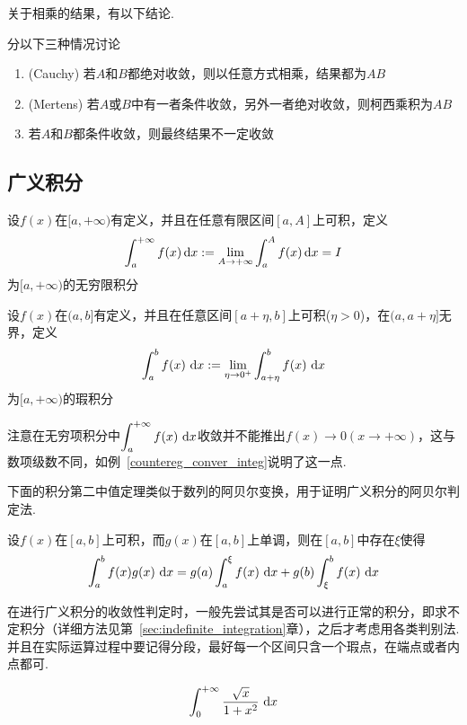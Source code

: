\par 关于相乘的结果，有以下结论.
\begin{theorem}[级数相乘]
分以下三种情况讨论
\begin{enumerate}
	\itemsep -3pt
	\item (Cauchy) 若$A$和$B$都绝对收敛，则以任意方式相乘，结果都为$AB$
	\item (Mertens) 若$A$或$B$中有一者条件收敛，另外一者绝对收敛，则柯西乘积为$AB$
	\item 若$A$和$B$都条件收敛，则最终结果不一定收敛
\end{enumerate}
\end{theorem}


\subsection{广义积分}
\begin{definition}[无穷限积分]
设$f(x)$在$[a,+\infty)$有定义，并且在任意有限区间$[a,A]$上可积，定义
\[\int_a^{+\infty}f(x)\,\mathrm{d} x:=\lim_{A\to+\infty}\int_a^Af(x)\,\mathrm{d} x=I\]
为$[a,+\infty)$的无穷限积分
\end{definition}
\begin{definition}[瑕积分]
设$f(x)$在$(a,b]$有定义，并且在任意区间$[a+\eta,b]$上可积($\eta>0$)，在$(a,a+\eta]$无界，定义
\[\displaystyle\int_{a}^{b}{f(x)}\,\,\mathrm{d} x:=\lim_{\eta\to0^+}\displaystyle\int_{a+\eta}^{b}{f(x)}\,\,\mathrm{d} x\]
为$[a,+\infty)$的瑕积分
\end{definition}
\par 注意在无穷项积分中$\displaystyle\int_{a}^{+\infty}{f(x)}\,\,\mathrm{d} x$收敛并不能推出$f(x)\to0(x\to+\infty)$，这与数项级数不同，如例~\ref{countereg_conver_integ}说明了这一点.
\par 下面的积分第二中值定理类似于数列的阿贝尔变换，用于证明广义积分的阿贝尔判定法.
\begin{theorem}[积分第二中值定理]
设$f(x)$在$[a,b]$上可积，而$g(x)$在$[a,b]$上单调，则在$[a,b]$中存在$\xi$使得
\[\displaystyle\int_{a}^{b}{f(x)g(x)}\,\,\mathrm{d} x=g(a)\displaystyle\int_{a}^{\xi}{f(x)}\,\,\mathrm{d} x+g(b)\displaystyle\int_{\xi}^{b}{f(x)}\,\,\mathrm{d} x\]
\end{theorem}
\par 在进行广义积分的收敛性判定时，一般先尝试其是否可以进行正常的积分，即求不定积分（详细方法见第~\ref{sec:indefinite_integration}章），之后才考虑用各类判别法. 并且在实际运算过程中要记得分段，最好每一个区间只含一个瑕点，在端点或者内点都可.
\begin{example}
\[\displaystyle\int_{0}^{+\infty}{\dfrac{\sqrt{x}}{1+x^2}}\,\,\mathrm{d} x\]
\end{example}
